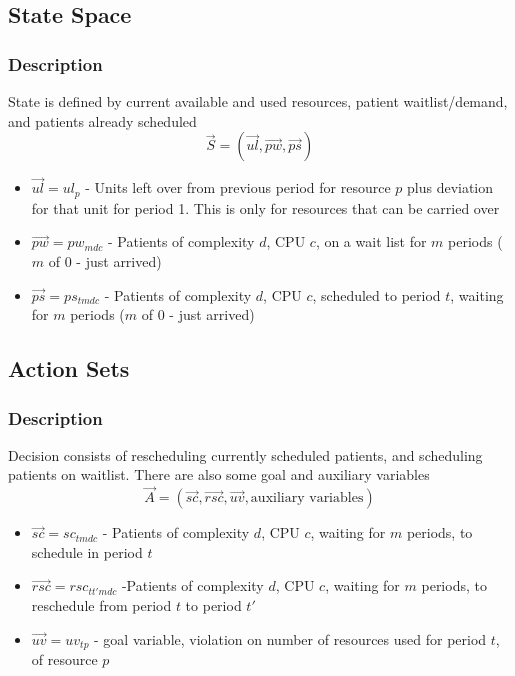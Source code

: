\documentclass{article}
\begin{document}
\subsection{State Space}
\subsubsection{Description}
State is defined by current available and used resources, patient waitlist/demand, and patients already scheduled
\[  \vec{S}  = (\vec{ul}, \vec{pw}, \vec{ps}) \]
\begin{itemize}
	\item $\vec{ul} = ul_{p}$ - Units left over from previous period for resource $p$ plus deviation for that unit for period 1. This is only for resources that can be carried over
    \item $\vec{pw} = pw_{mdc}$ - Patients of complexity $d$, CPU $c$, on a wait list for $m$ periods ($m$ of 0 - just arrived)
    \item $\vec{ps} = ps_{tmdc}$ - Patients of complexity $d$, CPU $c$, scheduled to period $t$, waiting for $m$ periods ($m$ of 0 - just arrived)
\end{itemize}

\subsection{Action Sets}
\subsubsection{Description}
Decision consists of rescheduling currently scheduled patients, and scheduling patients on waitlist. There are also some goal and auxiliary variables
\[  \vec{A} = (\vec{sc}, \vec{rsc}, \vec{uv}, \text{auxiliary variables}) \] 
\begin{itemize}
    	\item $\vec{sc} = sc_{tmdc}$ - Patients of complexity $d$, CPU $c$, waiting for $m$ periods, to schedule in period $t$
	\item $\vec{rsc} = rsc_{tt'mdc}$ -Patients of complexity $d$, CPU $c$, waiting for $m$ periods, to reschedule from period $t$ to period $t'$
	\item $\vec{uv} = uv_{tp}$ - goal variable, violation on number of resources used for period $t$, of resource $p$
\end{itemize}
\end{document}
